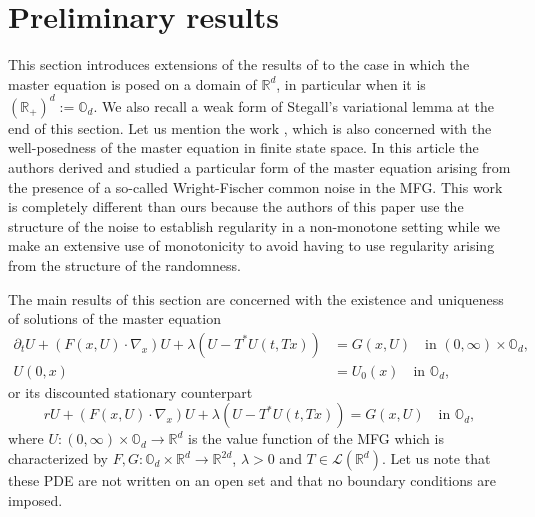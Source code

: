 \documentclass[10pt]{amsart}
\let\mathcal\mathscr
\theoremstyle{definition}
\begin{document}
\section{Preliminary results}\label{sec:1}
This section introduces extensions of the results of \cite{lions2007cours} to the case in which the master equation is posed on a domain of $\mathbb{R}^d$, in particular when it is $(\mathbb{R}_+)^d:= \mathbb{O}_d$. We also recall a weak form of Stegall's variational lemma at the end of this section. Let us mention the work \cite{bayraktar2019finite}, which is also concerned with the well-posedness of the master equation in finite state space. In this article the authors derived and studied a particular form of the master equation arising from the presence of a so-called Wright-Fischer common noise in the MFG. This work is completely different than ours because the authors of this paper use the structure of the noise to establish regularity in a non-monotone setting while we make an extensive use of monotonicity to avoid having to use regularity arising from the structure of the randomness.

The main results of this section are concerned with the existence and uniqueness of solutions of the master equation
\begin{equation}\label{me}
\begin{aligned}
\partial_t U+(F(x,U)\cdot \nabla_x)U+\lambda (U-T^*U(t,Tx))&= G(x,U) \quad\text{in } (0,\infty) \times \mathbb{O}_d,\\
U(0,x) &= U_0(x) \quad\text{in } \mathbb{O}_d,
\end{aligned}
\end{equation}
or its discounted stationary counterpart
\begin{equation}\label{sme}
r U+(F(x,U)\cdot \nabla_x)U+\lambda (U-T^*U(t,Tx))= G(x,U) \quad\text{in } \mathbb{O}_d,
\end{equation}
where $U: (0,\infty)\times \mathbb{O}_d \to \mathbb{R}^d$ is the value function of the MFG which is characterized by $F, G: \mathbb{O}_d \times \mathbb{R}^d\to \mathbb{R}^{2d}$, $\lambda > 0$ and $T \in \mathcal{L}(\mathbb{R}^d)$. Let us note that these PDE are not written on an open set and that no boundary conditions are imposed.
\end{document}
